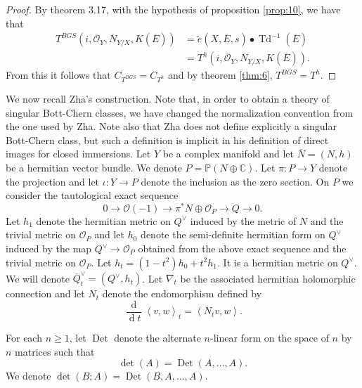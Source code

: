 \documentclass[10pt,twoside]{article}
\numberwithin{equation}{section}
\theoremstyle{plain}
\theoremstyle{definition}
\DeclareMathOperator{\Det}{Det}
\DeclareMathOperator{\Td}{Td}
\DeclareMathOperator{\dd}{d}
\begin{document}
\begin{proof}
  By \cite{BismutGilletSoule:MR1086887} theorem 3.17, with the
  hypothesis of proposition \ref{prop:10}, we have that
  \begin{align*}
    T^{BGS}(i,\overline {\mathcal{O}}_{Y},\overline N_{Y/X},K(\overline
    E))&=\widetilde e(X,\overline E,s)\bullet 
    \Td^{-1}(\overline E)\\
    &=T^{h}(i,\overline {\mathcal{O}}_{Y},\overline N_{Y/X},K(\overline
    E)).
  \end{align*}
  From this it follows that $C_{T^{BGS}}=C_{T^{h}}$ and by theorem
  \ref{thm:6}, $T^{BGS}=T^{h}$.
\end{proof}


We now recall Zha's construction. Note that, in order to
obtain a theory of singular Bott-Chern classes, we have changed the
normalization convention from the one
used by Zha. Note also that Zha does not define explicitly  a
singular Bott-Chern 
class, but such a definition is implicit in his definition of direct
images for closed immersions. Let $Y$ be a 
complex 
manifold and let $\overline N=(N,h)$ be a hermitian vector bundle. 
We denote $P=\mathbb{P}(N\oplus \mathbb{C})$. Let $\pi
\colon P\longrightarrow Y$ denote the projection and let
$\iota\colon Y\longrightarrow P$ denote the inclusion as the zero
section. On $P$ we consider the 
tautological exact sequence
\begin{displaymath}
  0\longrightarrow \mathcal{O}(-1)\longrightarrow \pi ^{\ast}N\oplus
  \mathcal{O}_{P} \longrightarrow Q\longrightarrow 0.
\end{displaymath}
Let $h_{1}$ denote the hermitian metric on $Q^{\vee}$ induced by the
metric of $N$ and the trivial metric on $\mathcal{O}_{P}$ and let
$h_{0}$ denote the semi-definite hermitian form on $Q^{\vee}$ induced
by the map $Q^{\vee}\longrightarrow \mathcal{O}_{P}$ obtained from the
above exact sequence and the trivial metric on $\mathcal{O}_{P}$.
Let $h_{t}=(1-t^{2})h_{0}+t^{2}h_{1}$. It is a hermitian metric on
$Q^{\vee}$. We will denote $\overline Q_{t}^{\vee}
=(Q^{\vee},h_{t})$. Let $\nabla_{t}$ be the associated hermitian holomorphic
connection and let $N_{t}$ denote  the endomorphism defined by
\begin{displaymath}
  \frac{\dd}{\dd t}\left<v,w\right>_{t}=\left<N_{t}v,w\right>.
\end{displaymath}

For each $n\ge 1$, let $\Det$ denote the alternate $n$-linear form on
the space of $n$ by $n$ matrices such that
\begin{displaymath}
  \det(A)=\Det(A,\dots ,A).
\end{displaymath}
We denote $\det(B;A)=\Det(B,A,\dots ,A)$.
\end{document}
